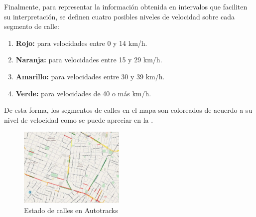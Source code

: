 Finalmente, para representar la información obtenida en intervalos que faciliten su interpretación, se definen cuatro posibles niveles de velocidad sobre cada segmento de calle:
\begin{enumerate}
\item \textbf{Rojo:}  para velocidades entre 0 y 14 km/h.
\item \textbf{Naranja:}  para velocidades entre 15 y 29 km/h.
\item \textbf{Amarillo:}  para velocidades entre 30 y 39 km/h.
\item \textbf{Verde:}  para velocidades de 40 o más km/h.
\end{enumerate}
De esta forma, los segmentos de calles en el mapa son coloreados de acuerdo a su nivel de velocidad como se puede apreciar en la .
\begin{figure}[h]
	\centering
	\includegraphics[width=0.45\textwidth]{apartados/figuras/estado_calles.jpg}
	\caption{\label{fig:calles} Estado de calles en Autotracks}	
\end{figure}
